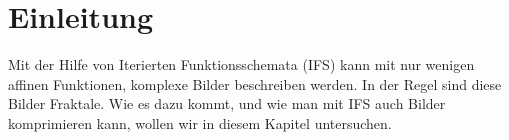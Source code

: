%
%
%
\section{Einleitung \label{ifs:section:teil0}}
Mit der Hilfe von Iterierten Funktionsschemata (IFS) kann mit nur wenigen affinen Funktionen, komplexe Bilder beschreiben werden.
In der Regel sind diese Bilder Fraktale.
Wie es dazu kommt, und wie man mit IFS auch Bilder komprimieren kann, wollen wir in diesem Kapitel untersuchen.


